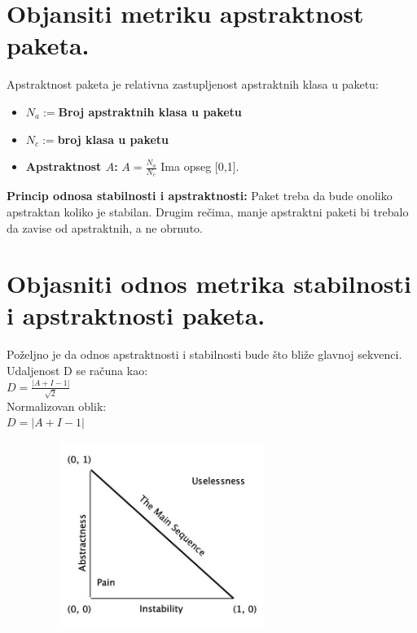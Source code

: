 \documentclass[a4paper]{article}
\begin{document}
\section{Objansiti metriku apstraktnost paketa.}
  Apstraktnost paketa je relativna zastupljenost apstraktnih klasa u paketu:
  \begin{itemize}
    \item \textbf{$N_a := $Broj apstraktnih klasa u paketu } 
    \item \textbf{$N_c := $broj klasa u paketu }
    \item \textbf{Apstraktnost $A$:} $A=\frac{N_a}{N_c}$ Ima opseg [0,1].
  \end{itemize}
  \textbf{Princip odnosa stabilnosti i apstraktnosti:} Paket treba da bude onoliko apstraktan 
  koliko je stabilan. Drugim rečima, manje apstraktni paketi bi trebalo da zavise od apstraktnih, 
  a ne obrnuto.
  
\section{Objasniti odnos metrika stabilnosti i apstraktnosti paketa.}
  Poželjno je da odnos apstraktnosti i stabilnosti bude što bliže glavnoj sekvenci. \\
  Udaljenost D se računa kao: \\
  \indent $D = \frac{|A+I-1|}{\sqrt{2}}$\\
  Normalizovan oblik:\\
  \indent $D = |A+I-1|$

  \begin{figure}[H]
    \begin{center}
        \includegraphics[width=80mm,height=60mm]{Slike/apstraktnost_i_stabilnost.jpg}
    \end{center}
  \end{figure}
\end{document}
